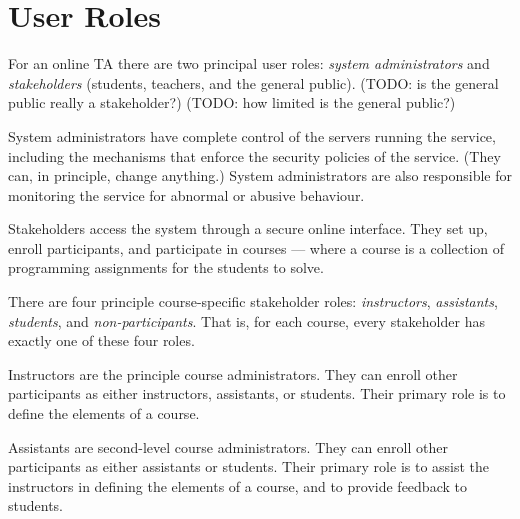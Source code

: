 
\section{User Roles}


For an online TA there are two principal user roles: \emph{system
administrators} and \emph{stakeholders} (students, teachers, and the general
public). (TODO: is the general public really a stakeholder?) (TODO: how limited
is the general public?)



System administrators have complete control of the servers running the service,
including the mechanisms that enforce the security policies of the service.
(They can, in principle, change anything.) System administrators are also
responsible for monitoring the service for abnormal or abusive behaviour.


Stakeholders access the system through a secure online interface. They set up,
enroll participants, and participate in courses --- where a course is a
collection of programming assignments for the students to solve.


There are four principle course-specific stakeholder roles: \emph{instructors},
\emph{assistants}, \emph{students}, and \emph{non-participants}. That is, for
each course, every stakeholder has exactly one of these four roles.

Instructors are the principle course administrators. They can enroll other
participants as either instructors, assistants, or students. Their primary role
is to define the elements of a course.

Assistants are second-level course administrators. They can enroll other
participants as either assistants or students. Their primary role is to assist
the instructors in defining the elements of a course, and to provide feedback
to students.

